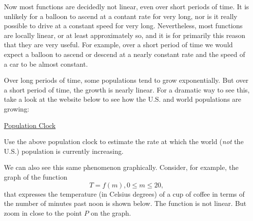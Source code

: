 \documentclass{ximera}
\begin{document}

Now most functions are decidedly not linear, even over short periods of time. It is unlikely for a balloon to ascend at a contant rate for very long, nor is it really possible to drive at a constant speed for very long. Nevertheless, most functions are locally linear, or at least approximately so, and it is for primarily this reason that they are very useful. For example, over a short period of time we would expect a balloon to ascend or descend at a nearly constant rate and the speed of a car to be almost constant. 

Over long periods of time, some populations tend to grow exponentially. But over a short period of time, the growth is nearly linear. For a dramatic way to see this, take a look at the website below to see how the U.S. and world populations are growing:

\href{https://www.census.gov/popclock/}{Population Clock}

\begin{question} \label{Q1:LF}
Use the above population clock to estimate the rate at which the world (\emph{not} the U.S.) population is currently increasing.
\end{question}

We can also see this same phenomenon graphically. Consider, for example, the graph of the function
\[
    T = f(m) , 0\leq m \leq 20 ,
\]
that expresses the temperature (in Celsius degrees) of a cup of coffee in terms of the number of minutes past noon is shown below. The function is not linear. But zoom in close to the point $P$ on the graph.
\end{document}
